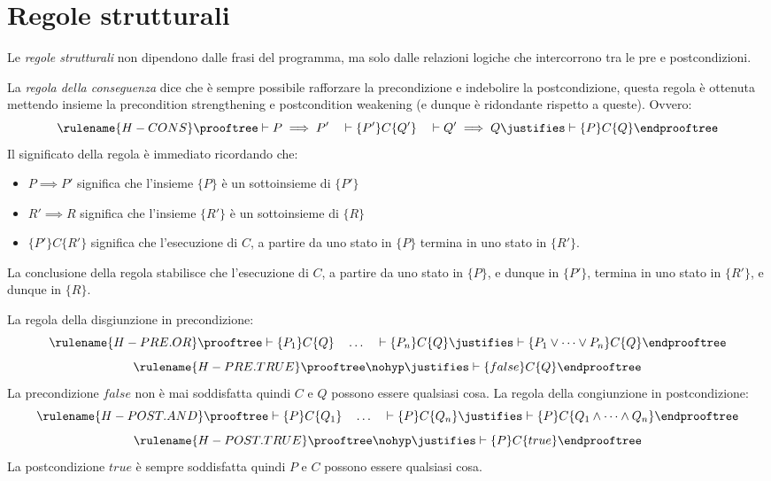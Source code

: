 \section{Regole strutturali}

Le \emph{regole strutturali} non dipendono dalle frasi del programma,
ma solo dalle relazioni logiche che intercorrono tra le pre e postcondizioni.

La \emph{regola della conseguenza} dice che è sempre possibile
rafforzare la precondizione e indebolire la postcondizione, questa
regola è ottenuta mettendo insieme la precondition strengthening e
postcondition weakening (e dunque è ridondante rispetto a queste).
Ovvero:
\[
  \rulename {H-CONS}
  \prooftree
    \vdash P \implies P'
    \quad
    \vdash \{P'\}C\{Q'\}
    \quad
    \vdash Q' \implies Q
   \justifies
     \vdash \{P\}C\{Q\}
  \endprooftree
\]
Il significato della regola è immediato ricordando che:
\begin{itemize}
    \item
     $P \implies P'$ significa che l'insieme $\{P\}$ è un sottoinsieme di $\{P'\}$
    \item
     $R' \implies R$ significa che l'insieme $\{R'\}$ è un sottoinsieme di $\{R\}$
    \item
     $\{P'\} C \{R'\}$ significa che l'esecuzione di $C$, a partire da uno stato in $\{P\}$ termina in uno stato in $\{R'\}$.
\end{itemize}

La conclusione della regola stabilisce che l'esecuzione di $C$, a partire da uno stato in $\{P\}$, e dunque in $\{P'\}$, termina in uno stato in $\{R'\}$, e dunque in $\{R\}$.

La regola della disgiunzione in precondizione:
\[
  \rulename {H-PRE.OR}
  \prooftree
    \vdash \{P_1\} C\{Q\}
    \quad
    \dots
    \quad
    \vdash \{P_n\} C\{Q\}
   \justifies
     \vdash \{P_1 \lor \dots \lor P_n\}C\{Q\}
  \endprooftree
\]
\pts
\[
  \rulename {H-PRE.TRUE}
  \prooftree
    \nohyp
   \justifies
     \vdash \{false\}C\{Q\}
  \endprooftree
\]
La precondizione $false$ non è mai soddisfatta quindi $C$ e $Q$ possono essere qualsiasi cosa.
La regola della congiunzione in postcondizione:
\[
  \rulename {H-POST.AND}
  \prooftree
    \vdash \{P\} C\{Q_1\}
    \quad
    \dots
    \quad
    \vdash \{P\} C\{Q_n\}
   \justifies
     \vdash \{P\}C\{Q_1 \land \dots \land Q_n\}
  \endprooftree
\]
\pts
\[
  \rulename {H-POST.TRUE}
  \prooftree
    \nohyp
   \justifies
     \vdash \{P\}C\{true\}
  \endprooftree
\]
La postcondizione $true$ è sempre soddisfatta quindi $P$ e $C$ possono essere qualsiasi cosa.

